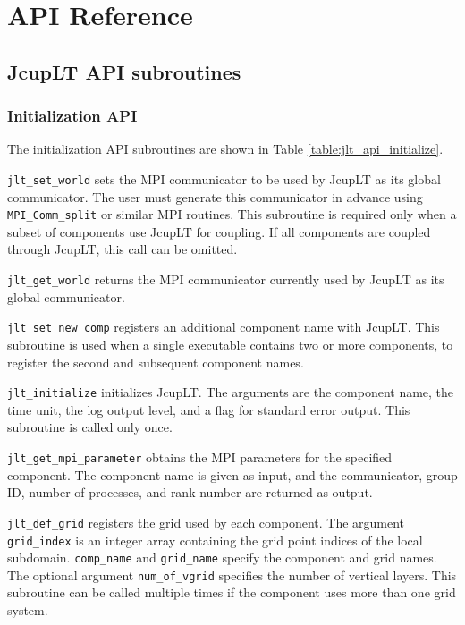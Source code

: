 \documentclass[11pt,a4paper]{report}
\newcommand{\tabref}[1]{Table \ref{#1}}
\begin{document}

\chapter{API Reference}

\section{JcupLT API subroutines}

\subsection{Initialization API}

The initialization API subroutines
are shown in \tabref{table:jlt_api_initialize}.

\texttt{jlt\_set\_world} sets
the MPI communicator to be used by JcupLT
as its global communicator.
The user must generate this communicator in advance
using \texttt{MPI\_Comm\_split} or similar MPI routines.
This subroutine is required only when
a subset of components use JcupLT for coupling.
If all components are coupled through JcupLT,
this call can be omitted.

\texttt{jlt\_get\_world} returns
the MPI communicator currently used by JcupLT
as its global communicator.

\texttt{jlt\_set\_new\_comp} registers
an additional component name with JcupLT.
This subroutine is used
when a single executable contains two or more components,
to register the second and subsequent component names.

\texttt{jlt\_initialize} initializes JcupLT.
The arguments are the component name,
the time unit, the log output level,
and a flag for standard error output.
This subroutine is called only once.

\texttt{jlt\_get\_mpi\_parameter} obtains
the MPI parameters for the specified component.
The component name is given as input,
and the communicator, group ID, number of processes,
and rank number are returned as output.

\texttt{jlt\_def\_grid} registers the grid
used by each component.
The argument \texttt{grid\_index} is an integer array
containing the grid point indices
of the local subdomain.
\texttt{comp\_name} and \texttt{grid\_name}
specify the component and grid names.
The optional argument \texttt{num\_of\_vgrid}
specifies the number of vertical layers.
This subroutine can be called multiple times
if the component uses more than one grid system.
\end{document}
